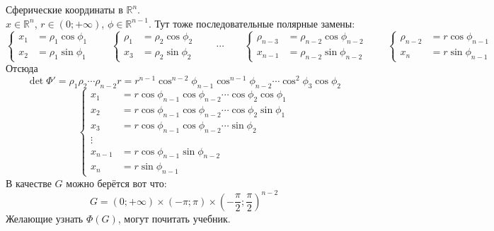 \documentclass{article}
\let\tmp\varphi
\let\varphi\phi
\let\phi\tmp
\begin{document}
    \begin{example}
        Сферические координаты в $\mathbb R^n$.\\
        $x\in\mathbb R^n$, $r\in(0;+\infty)$, $\varphi\in\mathbb R^{n-1}$. Тут тоже последовательные полярные замены:
        $$
        \left\{\begin{aligned}
            x_1&=\rho_1\cos\varphi_1\\
            x_2&=\rho_1\sin\varphi_1
        \end{aligned}\right.\qquad
        \left\{\begin{aligned}
            \rho_1&=\rho_2\cos\varphi_2\\
            x_3&=\rho_2\sin\varphi_2
        \end{aligned}\right.\qquad\cdots\qquad
        \left\{\begin{aligned}
            \rho_{n-3}&=\rho_{n-2}\cos\varphi_{n-2}\\
            x_{n-1}&=\rho_{n-2}\sin\varphi_{n-2}
        \end{aligned}\right.\qquad
        \left\{\begin{aligned}
            \rho_{n-2}&=r\cos\varphi_{n-1}\\
            x_n&=r\sin\varphi_{n-1}
        \end{aligned}\right.
        $$
        Отсюда $$
        \det\Phi'=\rho_1\rho_2\cdots\rho_{n-2}r=r^{n-1}\cos^{n-2}\varphi_{n-1}\cos^{n-1}\varphi_{n-2}\cdots\cos^2\varphi_3\cos\varphi_2
        $$
        $$
        \left\{\begin{aligned}
            x_1&=r\cos\varphi_{n-1}\cos\varphi_{n-2}\cdots\cos\varphi_2\cos\varphi_1\\
            x_2&=r\cos\varphi_{n-1}\cos\varphi_{n-2}\cdots\cos\varphi_2\sin\varphi_1\\
            x_3&=r\cos\varphi_{n-1}\cos\varphi_{n-2}\cdots\sin\varphi_2\\
            \vdots&\\
            x_{n-1}&=r\cos\varphi_{n-1}\sin\varphi_{n-2}\\
            x_n&=r\sin\varphi_{n-1}
        \end{aligned}\right.
        $$
        В качестве $G$ можно берётся вот что:
        $$
        G=(0;+\infty)\times(-\pi;\pi)\times\left(-\frac\pi2;\frac\pi2\right)^{n-2}
        $$
        Желающие узнать $\Phi(G)$, могут почитать учебник.
    \end{example}
\end{document}
